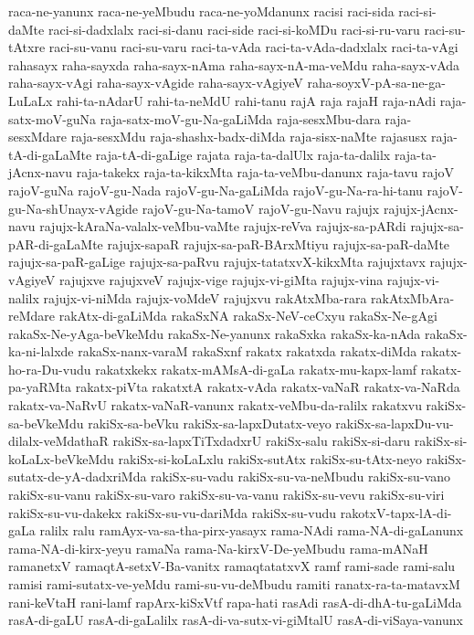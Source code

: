 {raca-ne-yanunx
raca-ne-yeMbudu
raca-ne-yoMdanunx
racisi
raci-sida
raci-si-daMte
raci-si-dadxlalx
raci-si-danu
raci-side
raci-si-koMDu
raci-si-ru-varu
raci-su-tAtxre
raci-su-vanu
raci-su-varu
raci-ta-vAda
raci-ta-vAda-dadxlalx
raci-ta-vAgi
rahasayx
raha-sayxda
raha-sayx-nAma
raha-sayx-nA-ma-veMdu
raha-sayx-vAda
raha-sayx-vAgi
raha-sayx-vAgide
raha-sayx-vAgiyeV
raha-soyxV-pA-sa-ne-ga-LuLaLx
rahi-ta-nAdarU
rahi-ta-neMdU
rahi-tanu
rajA
raja
rajaH
raja-nAdi
raja-satx-moV-guNa
raja-satx-moV-gu-Na-gaLiMda
raja-sesxMbu-dara
raja-sesxMdare
raja-sesxMdu
raja-shashx-badx-diMda
raja-sisx-naMte
rajasusx
raja-tA-di-gaLaMte
raja-tA-di-gaLige
rajata
raja-ta-dalUlx
raja-ta-dalilx
raja-ta-jAcnx-navu
raja-takekx
raja-ta-kikxMta
raja-ta-veMbu-danunx
raja-tavu
rajoV
rajoV-guNa
rajoV-gu-Nada
rajoV-gu-Na-gaLiMda
rajoV-gu-Na-ra-hi-tanu
rajoV-gu-Na-shUnayx-vAgide
rajoV-gu-Na-tamoV
rajoV-gu-Navu
rajujx
rajujx-jAcnx-navu
rajujx-kAraNa-valalx-veMbu-vaMte
rajujx-reVva
rajujx-sa-pARdi
rajujx-sa-pAR-di-gaLaMte
rajujx-sapaR
rajujx-sa-paR-BArxMtiyu
rajujx-sa-paR-daMte
rajujx-sa-paR-gaLige
rajujx-sa-paRvu
rajujx-tatatxvX-kikxMta
rajujxtavx
rajujx-vAgiyeV
rajujxve
rajujxveV
rajujx-vige
rajujx-vi-giMta
rajujx-vina
rajujx-vi-nalilx
rajujx-vi-niMda
rajujx-voMdeV
rajujxvu
rakAtxMba-rara
rakAtxMbAra-reMdare
rakAtx-di-gaLiMda
rakaSxNA
rakaSx-NeV-ceCxyu
rakaSx-Ne-gAgi
rakaSx-Ne-yAga-beVkeMdu
rakaSx-Ne-yanunx
rakaSxka
rakaSx-ka-nAda
rakaSx-ka-ni-lalxde
rakaSx-nanx-varaM
rakaSxnf
rakatx
rakatxda
rakatx-diMda
rakatx-ho-ra-Du-vudu
rakatxkekx
rakatx-mAMsA-di-gaLa
rakatx-mu-kapx-lamf
rakatx-pa-yaRMta
rakatx-piVta
rakatxtA
rakatx-vAda
rakatx-vaNaR
rakatx-va-NaRda
rakatx-va-NaRvU
rakatx-vaNaR-vanunx
rakatx-veMbu-da-ralilx
rakatxvu
rakiSx-sa-beVkeMdu
rakiSx-sa-beVku
rakiSx-sa-lapxDutatx-veyo
rakiSx-sa-lapxDu-vu-dilalx-veMdathaR
rakiSx-sa-lapxTiTxdadxrU
rakiSx-salu
rakiSx-si-daru
rakiSx-si-koLaLx-beVkeMdu
rakiSx-si-koLaLxlu
rakiSx-sutAtx
rakiSx-su-tAtx-neyo
rakiSx-sutatx-de-yA-dadxriMda
rakiSx-su-vadu
rakiSx-su-va-neMbudu
rakiSx-su-vano
rakiSx-su-vanu
rakiSx-su-varo
rakiSx-su-va-vanu
rakiSx-su-vevu
rakiSx-su-viri
rakiSx-su-vu-dakekx
rakiSx-su-vu-dariMda
rakiSx-su-vudu
rakotxV-tapx-lA-di-gaLa
ralilx
ralu
ramAyx-va-sa-tha-pirx-yasayx
rama-NAdi
rama-NA-di-gaLanunx
rama-NA-di-kirx-yeyu
ramaNa
rama-Na-kirxV-De-yeMbudu
rama-mANaH
ramanetxV
ramaqtA-setxV-Ba-vanitx
ramaqtatatxvX
ramf
rami-sade
rami-salu
ramisi
rami-sutatx-ve-yeMdu
rami-su-vu-deMbudu
ramiti
ranatx-ra-ta-matavxM
rani-keVtaH
rani-lamf
rapArx-kiSxVtf
rapa-hati
rasAdi
rasA-di-dhA-tu-gaLiMda
rasA-di-gaLU
rasA-di-gaLalilx
rasA-di-va-sutx-vi-giMtalU
rasA-di-viSaya-vanunx
}
